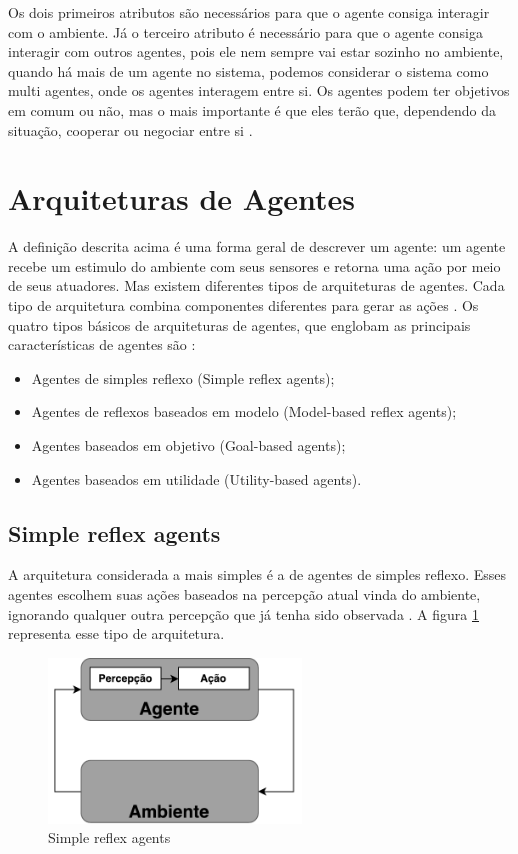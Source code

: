 Os dois primeiros atributos são necessários para que o agente consiga interagir com o ambiente. Já o terceiro atributo é necessário para que o agente consiga interagir com outros agentes, pois ele nem sempre vai estar sozinho no ambiente, quando há mais de um agente no sistema, podemos considerar o sistema como multi agentes, onde os agentes interagem entre si. Os agentes podem ter objetivos em comum ou não, mas o mais importante é que eles terão que, dependendo da situação, cooperar ou negociar entre si \cite{intelligence2003modern}.    

\section{Arquiteturas de Agentes}
A definição descrita acima é uma forma geral de descrever um agente: um agente recebe um estimulo do ambiente com seus sensores e retorna uma ação por meio de seus atuadores. Mas existem diferentes tipos de arquiteturas de agentes. Cada tipo de arquitetura combina componentes diferentes para gerar as ações \cite{intelligence2003modern}. Os quatro tipos básicos de arquiteturas de agentes, que englobam as principais características de agentes são \cite{intelligence2003modern}: 

\begin{itemize}
	\item Agentes de simples reflexo (Simple reflex agents);
	\item Agentes de reflexos baseados em modelo (Model-based reflex agents);
	\item Agentes baseados em objetivo (Goal-based agents);
	\item Agentes baseados em utilidade (Utility-based agents).
\end{itemize}  

\subsection{Simple reflex agents}

A arquitetura considerada a mais simples é a de agentes de simples reflexo. Esses agentes escolhem suas ações baseados na percepção atual vinda do ambiente, ignorando qualquer outra percepção que já tenha sido observada \cite{intelligence2003modern}. A figura \ref{fig:agenteSimple} representa esse tipo de arquitetura. 

\begin{figure}[ht]
	\centering
	\includegraphics[width=0.6\textwidth]{fig/agentSimple.pdf}
	\caption{Simple reflex agents}
	\label{fig:agenteSimple}
\end{figure} 

